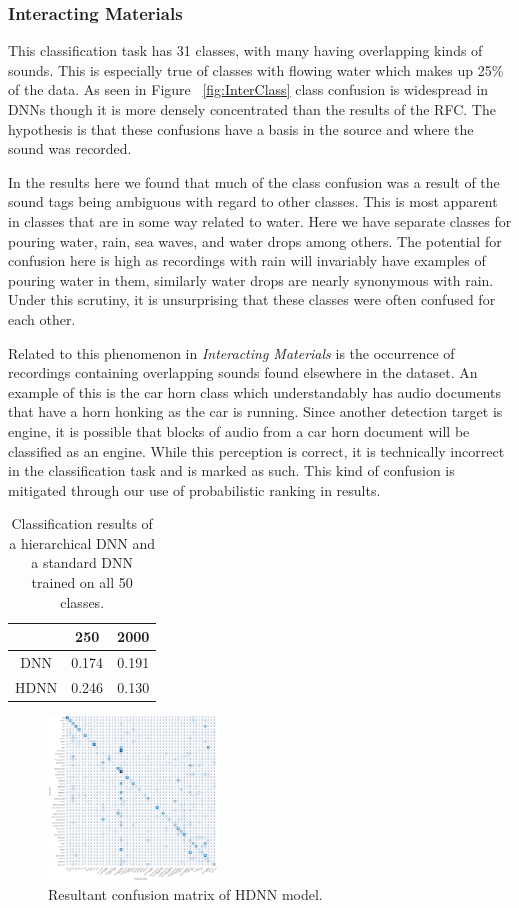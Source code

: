 \subsubsection{Interacting Materials}
This classification task has 31 classes, with many having overlapping kinds of sounds. This is especially true of classes with flowing water which makes up 25\% of the data. As seen in Figure ~\ref{fig:InterClass} class confusion is widespread in DNNs though it is more densely concentrated than the results of the RFC. The hypothesis is that these confusions have a basis in the source and where the sound was recorded.

In the results here we found that much of the class confusion was a result of the sound tags being ambiguous with regard to other classes. This is most apparent in classes that are in some way related to water. Here we have separate classes for pouring water, rain, sea waves, and water drops among others. The potential for confusion here is high as recordings with rain will invariably have examples of pouring water in them, similarly water drops are nearly synonymous with rain. Under this scrutiny, it is unsurprising that these classes were often confused for each other.

Related to this phenomenon in \textit{Interacting Materials} is the occurrence of recordings containing overlapping sounds found elsewhere in the dataset. An example of this is the car horn class which understandably has audio documents that have a horn honking as the car is running. Since another detection target is engine, it is possible that blocks of audio from a car horn document will be classified as an engine. While this perception is correct, it is technically incorrect in the classification task and is marked as such. This kind of confusion is mitigated through our use of probabilistic ranking in results.

\begin{table}[h]
    \centering
    \begin{tabular}{ccc}
         & 250   & 2000  \\ \hline
    DNN  & 0.174 & 0.191 \\
    HDNN & 0.246 & 0.130
    \end{tabular}
    \caption{Classification results of a hierarchical DNN and a standard DNN trained on all 50 classes.}
    \label{tab:overallprec}
\end{table}


\begin{figure}[h]
    \caption{Resultant confusion matrix of HDNN model.}
    \label{fig:Overall}
    \includegraphics[width=0.40\textwidth]{figures/Overall.png}
\end{figure}

